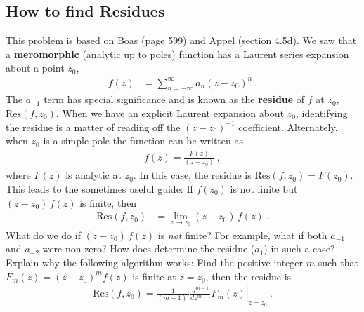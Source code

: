 \documentclass[12pt]{article}
\numberwithin{equation}{subsection}    %
\begin{document}







\subsection{How to find Residues}

This problem is based on Boas (page 599) and Appel (section 4.5d).
%
We saw that a \textbf{meromorphic} (analytic up to poles) function has a Laurent series expansion about a point $z_0$,
\begin{align}
f(z) &= \sum_{n=-\infty}^{\infty} a_n (z-z_0)^n
	\ .
\end{align}
The $a_{-1}$ term has special significance and is known as the \textbf{residue} of $f$ at $z_0$, $\text{Res}(f,z_0)$. When we have an explicit Laurent expansion about $z_0$, identifying the residue is a matter of reading off the $(z-z_0)^{-1}$ coefficient. Alternately, when $z_0$ is a simple pole the function can be written as
\begin{align}
	f(z) = \frac{F(z)}{(z-z_0)} \ ,
\end{align}
where $F(z)$ is analytic at $z_0$. In this case, the residue is $\text{Res}(f,z_0) = F(z_0)$. This leads to the sometimes useful guide: If $f(z_0)$ is not finite but $(z-z_0)\, f(z)$ is finite, then
	\begin{align}
		\text{Res}(f,z_0) &=  \lim_{z\to z_0} (z-z_0)\, f(z) \ .
	\end{align}
What do we do if $(z-z_0)\, f(z)$ is \emph{not} finite? For example, what if both $a_{-1}$ and $a_{-2}$ were non-zero? How does determine the residue ($a_1$) in such a case? Explain why the following algorithm works: Find the positive integer $m$ such that $F_m(z)=(z-z_0)^m f(z)$ is finite at $z=z_0$, then the residue is
\begin{align}
	\text{Res}(f,z_0) = \left.\frac{1}{(m-1)!} \frac{d^{m-1}}{dz^{m-1}} F_m(z)\right|_{z=z_0} \ .
\end{align}
\end{document}
